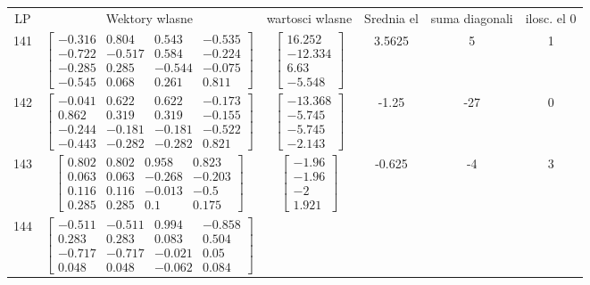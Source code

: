 \documentclass[a4paper,12pt]{article}
\begin{document}
\bgroup {} \vspace{0.2in} \begin{tabular}{c c c c c c}
LP &Wektory wlasne & wartosci wlasne & Srednia el & suma diagonali & ilosc. el 0\\
141
&
$\begin{bmatrix} -0.316 & 0.804 & 0.543 & -0.535 \\ -0.722 & -0.517 & 0.584 & -0.224 \\ -0.285 & 0.285 & -0.544 & -0.075 \\ -0.545 & 0.068 & 0.261 & 0.811 \end{bmatrix}$
&
$\begin{bmatrix} 16.252 \\ -12.334 \\ 6.63 \\ -5.548 \end{bmatrix}$
&
3.5625
&
5
&
1
\\
142
&
$\begin{bmatrix} -0.041 & 0.622 & 0.622 & -0.173 \\ 0.862 & 0.319 & 0.319 & -0.155 \\ -0.244 & -0.181 & -0.181 & -0.522 \\ -0.443 & -0.282 & -0.282 & 0.821 \end{bmatrix}$
&
$\begin{bmatrix} -13.368 \\ -5.745 \\ -5.745 \\ -2.143 \end{bmatrix}$
&
-1.25
&
-27
&
0
\\
143
&
$\begin{bmatrix} 0.802 & 0.802 & 0.958 & 0.823 \\ 0.063 & 0.063 & -0.268 & -0.203 \\ 0.116 & 0.116 & -0.013 & -0.5 \\ 0.285 & 0.285 & 0.1 & 0.175 \end{bmatrix}$
&
$\begin{bmatrix} -1.96 \\ -1.96 \\ -2 \\ 1.921 \end{bmatrix}$
&
-0.625
&
-4
&
3
\\
144
&
$\begin{bmatrix} -0.511 & -0.511 & 0.994 & -0.858 \\ 0.283 & 0.283 & 0.083 & 0.504 \\ -0.717 & -0.717 & -0.021 & 0.05 \\ 0.048 & 0.048 & -0.062 & 0.084 \end{bmatrix}$

\end{tabular}
\end{document}
